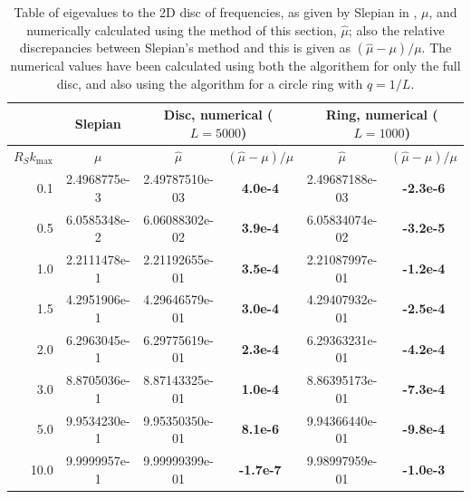 \documentclass[11pt,a4paper, 
swedish,english %
]{article}
\begin{document}
\begin{table}
\centering
\caption{Table of eigevalues to the 2D disc of frequencies, as given
  by Slepian in \cite{PSWF-IV_1964}, $\mu$, and numerically
  calculated using the method of this section, $\hat\mu$; also the
  relative discrepancies between Slepian's method and this is given as
  $(\hat\mu-\mu)/\mu$. The numerical values have been
  calculated using both the algorithem for only the full disc, and
  also using the algorithm for a circle ring with $q=1/L$.
}
\label{tab:verification}
\begin{tabular}{|r|c|c|c|c|c|}\cline{2-6}
\multicolumn{1}{c|}{}
&Slepian\cite{PSWF-IV_1964}&
\multicolumn{2}{|c|}{Disc, numerical ($L=5000$)}&
\multicolumn{2}{|c|}{Ring, numerical ($L=1000$)}
\\ \hline
$R_Sk_{\max}$&$\mu$
&$\hat\mu$&$(\hat\mu-\mu)/\mu$
&$\hat\mu$&$(\hat\mu-\mu)/\mu$
\\ \hline
  0.1 & 2.4968775e-3 & 
2.49787510e-03 &\bf\phantom{-}4.0e-4&  
2.49687188e-03 &\bf-2.3e-6
\\ \hline
  0.5 & 6.0585348e-2 & 
6.06088302e-02 &\bf\phantom{-}3.9e-4&  
6.05834074e-02 &\bf-3.2e-5
\\ \hline
  1.0 & 2.2111478e-1 & 
2.21192655e-01 &\bf\phantom{-}3.5e-4&  
2.21087997e-01 &\bf-1.2e-4
\\ \hline
  1.5 & 4.2951906e-1 & 
4.29646579e-01 &\bf\phantom{-}3.0e-4&  
4.29407932e-01 &\bf-2.5e-4
\\ \hline
  2.0 & 6.2963045e-1 & 
6.29775619e-01 &\bf\phantom{-}2.3e-4&  
6.29363231e-01 &\bf-4.2e-4
\\ \hline
  3.0 & 8.8705036e-1 & 
8.87143325e-01 &\bf\phantom{-}1.0e-4&  
8.86395173e-01 &\bf-7.3e-4
\\ \hline
  5.0 & 9.9534230e-1 & 
9.95350350e-01 &\bf\phantom{-}8.1e-6&  
9.94366440e-01 &\bf-9.8e-4
\\ \hline
 10.0 & 9.9999957e-1 & 
9.99999399e-01 &\bf\phantom{}-1.7e-7&  
9.98997959e-01 &\bf-1.0e-3
\\ \hline
\end{tabular}
\end{table}


\end{document}
